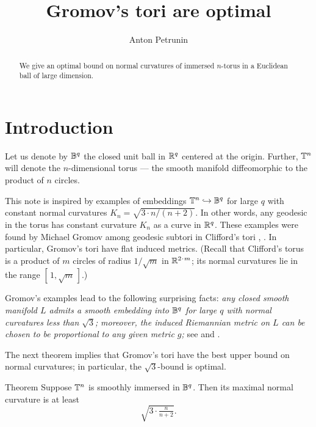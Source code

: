 \documentclass[a4paper,10pt]{article}
\def\thetitle{Gromov's tori are optimal}
\def\theauthors{Anton Petrunin}
\begin{document}


\title{\thetitle}
\author{\theauthors}
\date{}
\maketitle

\begin{abstract}
We give an optimal bound on normal curvatures of immersed $n$-torus in a Euclidean ball of large dimension. 
\end{abstract}

\section{Introduction}

Let us denote by $\mathbb{B}^q$ the closed unit ball in $\mathbb{R}^q$ centered at the origin.
Further, $\mathbb{T}^n$ will denote the $n$-dimensional torus --- the smooth manifold diffeomorphic to the product of $n$ circles.

This note is inspired by examples of embeddings $\mathbb{T}^n\hookrightarrow\mathbb{B}^q$ for large $q$ with constant normal curvatures $K_n=\sqrt{3\cdot n/(n+2)}$.
In other words, any geodesic in the torus has constant curvature $K_n$ as a curve in $\mathbb{R}^q$.
These examples were found by Michael Gromov among geodesic subtori in Clifford's tori 
\cite[2.A]{gromov3}, \cite[1.1.A.]{gromov2}.
In particular, Gromov's tori have flat induced metrics.
(Recall that Clifford's torus is a product of $m$  circles of radius ${1}/{\sqrt{m}}$ in $\RR^{2\cdot m}$;
its normal curvatures lie in the range $[\,1,\sqrt{m}\,]$.)


Gromov's examples lead to the following surprising facts:
\textit{any closed smooth manifold $L$ admits a smooth embedding into $\mathbb{B}^q$ for large $q$ with normal curvatures less than $\sqrt{3}$;}
\textit{moreover, the induced Riemannian metric on $L$ can be chosen to be proportional to any given metric $g$;}
see \cite[1.D]{gromov3} and \cite[1.1.C]{gromov2}.

The next theorem implies that Gromov's tori have the best upper bound on normal curvatures;
in particular, the $\sqrt3$-bound is optimal.

\begin{thm}{Theorem}
\label{thm:main}
Suppose $\mathbb{T}^n$ is smoothly immersed in $\mathbb{B}^q$.
Then its maximal normal curvature is at least 
\[\sqrt{3\cdot \tfrac{n}{n+2}}.\]
\end{thm}
\end{document}
